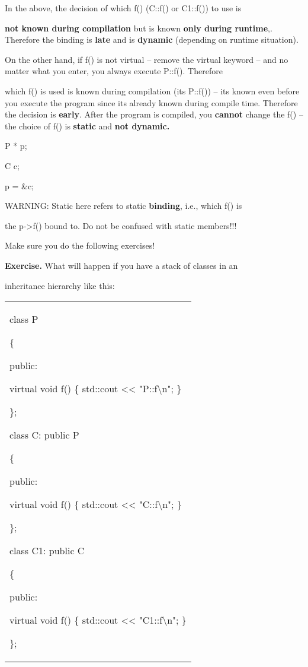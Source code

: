 \documentclass[
]{article}
\begin{document}
In the above, the decision of which f() (C::f() or C1::f()) to use is

\textbf{not known during compilation }but is known \textbf{only during
runtime},. Therefore the binding is \textbf{late }and is \textbf{dynamic
}(depending on runtime situation).

On the other hand, if f() is not virtual -- remove the virtual keyword
-- and no matter what you enter, you always execute P::f(). Therefore

which f() is used is known during compilation (it\textquotesingle s
P::f()) -- it\textquotesingle s known even before you execute the
program since it\textquotesingle s already known during compile time.
Therefore the decision is \textbf{early}. After the program is compiled,
you \textbf{cannot }change the f() -- the choice of f() is
\textbf{static }and \textbf{not dynamic.}

\textbf{ }P * p;

C c;

p = \&c;

WARNING: Static here refers to static \textbf{binding}, i.e., which f()
is

the p-\textgreater f() bound to. Do not be confused with static
members!!!

Make sure you do the following exercises!

\textbf{Exercise. }What will happen if you have a stack of classes in an

inheritance hierarchy like this:

\begin{longtable}[]{@{}
  >{\raggedright\arraybackslash}p{}@{}}
\toprule\noalign{}
 \\
\midrule\noalign{}
\endhead
\bottomrule\noalign{}
\endlastfoot
class P

\{

public:

virtual void f() \{ std::cout \textless\textless{}
"P::f\textbackslash n"; \}

\};

class C: public P

\{

public:

virtual void f() \{ std::cout \textless\textless{}
"C::f\textbackslash n"; \}

\};

class C1: public C

\{

public:

virtual void f() \{ std::cout \textless\textless{}
"C1::f\textbackslash n"; \}

\}; \\
\end{longtable}
\end{document}
